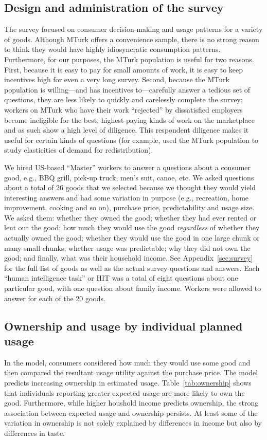\documentclass[11pt]{article}
\begin{document}
\subsection{Design and administration of the survey}
The survey focused on consumer decision-making and usage patterns for a variety of goods. 
Although MTurk offers a convenience sample, there is no strong reason to think they would have highly idiosyncratic consumption patterns. 
Furthermore, for our purposes, the MTurk population is useful for two reasons. 
First, because it is easy to pay for small amounts of work, it is easy to keep incentives high for even a very long survey. 
Second, because the MTurk population is willing---and has incentives to---carefully answer a tedious set of questions, they are less likely to quickly and carelessly complete the survey; 
workers on MTurk who have their work ``rejected'' by dissatisfied employers become ineligible for the best, highest-paying kinds of work on the marketplace and as such show a high level of diligence.    
This respondent diligence makes it useful for certain kinds of questions (for example, \cite{kuziemko2013elastic} used the MTurk population to study elasticities of demand for redistribution).  

We hired US-based ``Master'' workers to answer a questions about a consumer good, e.g., BBQ grill, pick-up truck, men's suit, canoe, etc.
We asked questions about a total of 26 goods that we selected because we thought they would yield interesting answers and had some variation in purpose (e.g., recreation, home improvement, cooking and so on), purchase price, predictability and usage size. 
We asked them: whether they owned the good; whether they had ever rented or lent out the good; how much they would use the good \emph{regardless} of whether they actually owned the good; whether they would use the good in one large chunk or many small chunks; whether usage was predictable; why they did not own the good; and finally, what was their household income. 
See Appendix~\ref{sec:survey} for the full list of goods as well as the actual survey questions and answers.  
Each ``human intelligence task'' or HIT was a total of eight questions about one particular good, with one question about family income. 
Workers were allowed to answer for each of the 20 goods.  


\subsection{Ownership and usage by individual planned usage} 
In the model, consumers considered how much they would use some good and then compared the resultant usage utility against the purchase price. 
The model predicts increasing ownership in estimated usage.
Table~\ref{tab:ownership} shows that individuals reporting greater expected usage are more likely to own the good.
Furthermore, while higher houshold income predicts ownership, the strong association between expected usage and ownership persists.
At least some of the variation in ownership is not solely explained by differences in income but also by differences in taste. 
\end{document}

